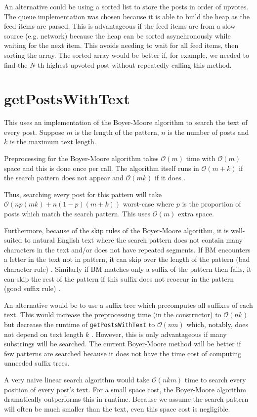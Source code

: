 \documentclass[11pt,a4paper]{article} %
\begin{document}
An alternative could be using a sorted list to store the posts 
in order of upvotes.
The queue implementation was 
chosen because it is able to build the heap as the feed items are parsed.
This is advantageous if the feed items are from a slow source (e.g. network)
because the heap can be sorted asynchronously while waiting for the next 
item. This avoids needing to wait for all feed items, then sorting the array.
The sorted array would be better if, for example, we needed to find the $N$-th highest 
upvoted post without repeatedly calling this method.

\section*{getPostsWithText}
This uses an implementation of the Boyer-Moore algorithm to search 
the text of every post. Suppose $m$ is the length of the  pattern,
 $n$ is the number of posts and $k$ is the maximum text length.

Preprocessing for the Boyer-Moore algorithm takes $\mathcal O(m)$ time
with $\mathcal O(m)$ space 
and this is done once per call.
The algorithm itself runs in $\mathcal O(m + k)$ if the 
search pattern does not appear and $\mathcal O(mk)$ if it does \cite{sustik}. 

Thus, searching every post for this pattern will take $\mathcal O(np(mk) + n(1-p)(m+k))$
worst-case where $p$ is the proportion of posts which match the search pattern.
This uses $\mathcal O(m)$ extra space.

Furthermore, because of the skip rules of the Boyer-Moore algorithm, it is 
well-suited to natural English text where the search pattern does not contain many 
characters in the text and/or does not have repeated segments. 
If BM encounters a letter in the text not in pattern, it can skip over the length of the pattern
(bad character rule) \cite{jhu}.
Similarly if BM matches only a suffix of the pattern then fails, it can skip the rest of the pattern 
if this suffix does not reoccur in the pattern (good suffix rule) \cite{jhu}.

An alternative would be to use a suffix tree which precomputes all suffixes of 
each text. This would increase the preprocessing time (in the constructor) 
to $\mathcal O(nk)$ but decrease the runtime of \verb|getPostsWithText|
to $\mathcal O(nm)$ which, notably, does not depend on text length $k$ \cite{suffix}.
However, this is only advantageous if many substrings will be searched. The current 
Boyer-Moore method will be better if few patterns are searched because it does not 
have the time cost of computing unneeded suffix trees.

A very naive linear search algorithm would take $\mathcal O(nkm)$ time to search 
every position of every post's text. For a small space cost, the Boyer-Moore algorithm
dramatically outperforms this in runtime. Because we assume the search pattern will often 
be much smaller than the text, even this space cost is negligible. 



\end{document}
